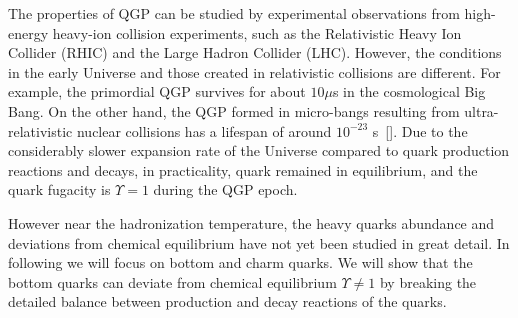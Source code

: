 The properties of QGP can be studied by experimental observations from high-energy heavy-ion collision experiments, such as  the Relativistic Heavy Ion Collider (RHIC) and the Large Hadron Collider (LHC). However, the conditions in the early Universe and those created in relativistic collisions are different. For example, the primordial QGP survives for about $10\mu$s in the cosmological Big Bang. On the other hand, the QGP formed in micro-bangs resulting from ultra-relativistic nuclear collisions has a lifespan of around  $10^{-23}$ s~[\cite{Rafelski:2001hp}]. Due to the considerably slower expansion rate of the Universe compared to quark production reactions and decays, in practicality, quark remained in equilibrium, and the quark fugacity is $\Upsilon=1$ during the QGP epoch.


However near the hadronization temperature, the heavy quarks abundance and deviations from chemical equilibrium have not yet been studied in great detail. In following we will focus on bottom and charm quarks. We will show that the bottom quarks can deviate from chemical equilibrium $\Upsilon\neq1$ by breaking the detailed balance between production and decay reactions of the quarks.



